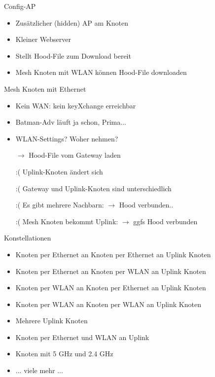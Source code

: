 \begin{frame}{Config-AP}
    \begin{itemize}
        \item Zusätzlicher (hidden) AP am Knoten
        \item Kleiner Webserver
        \item Stellt Hood-File zum Download bereit
        \item Mesh Knoten mit WLAN können Hood-File downloaden
    \end{itemize}
\end{frame}

\begin{frame}{Mesh Knoten mit Ethernet}
    \begin{itemize}
        \item Kein WAN: kein keyXchange erreichbar
        \item Batman-Adv läuft ja schon, Prima...
        \item WLAN-Settings? Woher nehmen?
        \item[$\rightarrow$] Hood-File vom Gateway laden
        \item[:(] Uplink-Knoten ändert sich
        \item[:(] Gateway und Uplink-Knoten sind unterschiedlich
        \item[:(] Es gibt mehrere Nachbarn: $\rightarrow$ Hood verbunden..
        \item[:(] Mesh Knoten bekommt Uplink: $\rightarrow$ ggfs Hood verbunden
    \end{itemize}
\end{frame}

\begin{frame}{Konstellationen}
    \begin{itemize}
        \item Knoten per Ethernet an Knoten per Ethernet an Uplink Knoten
        \item Knoten per Ethernet an Knoten per WLAN an Uplink Knoten
        \item Knoten per WLAN an Knoten per Ethernet an Uplink Knoten
        \item Knoten per WLAN an Knoten per WLAN an Uplink Knoten
        \item Mehrere Uplink Knoten
        \item Knoten per Ethernet und WLAN an Uplink
        \item Knoten mit 5 GHz und 2.4 GHz
        \item ... viele mehr ...
    \end{itemize}
\end{frame}

